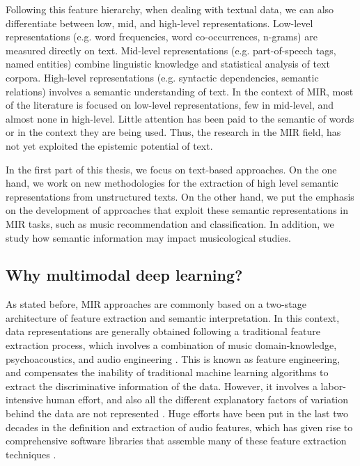 Following this feature hierarchy, when dealing with textual data, we can also differentiate between low, mid, and high-level representations. Low-level representations (e.g. word frequencies, word co-occurrences, n-grams) are measured directly on text. Mid-level representations (e.g. part-of-speech tags, named entities) combine linguistic knowledge and statistical analysis of text corpora. High-level representations (e.g. syntactic dependencies, semantic relations) involves a semantic understanding of text. In the context of MIR, most of the literature is focused on low-level representations, few in mid-level, and almost none in high-level. Little attention has been paid to the semantic of words or in the context they are being used. Thus, the research in the MIR field, has not yet exploited the epistemic potential of text.

In the first part of this thesis, we focus on text-based approaches. On the one hand, we work on new methodologies for the extraction of high level semantic representations from unstructured texts. On the other hand, we put the emphasis on the development of approaches that exploit these semantic representations in MIR tasks, such as music recommendation and classification. In addition, we study how semantic information may impact musicological studies.

\subsection{Why multimodal deep learning?}
\label{sec:intro:learning}

As stated before, MIR approaches are commonly based on a two-stage architecture of feature extraction and semantic interpretation. In this context, data representations are generally obtained following a traditional feature extraction process, which involves a combination of music domain-knowledge, psychoacoustics, and audio engineering \citep{humphrey2012}. 
This is known as feature engineering, and compensates the inability of traditional machine learning algorithms to extract the discriminative information of the data. However, it involves a labor-intensive human effort, and also all the different explanatory factors of variation behind the data are not represented \citep{bengio2013representation}. 
Huge efforts have been put in the last two decades in the definition and extraction of audio features, which has given rise to comprehensive software libraries that assemble many of these feature extraction techniques \citep{bogdanov2013essentia, Mcfee2015}. 


